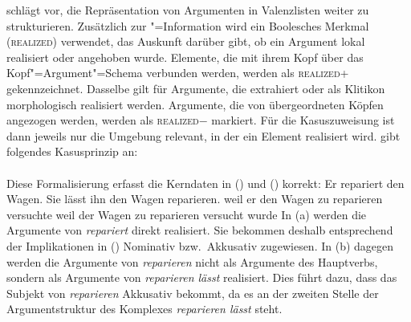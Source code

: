 \prz schlägt vor, die Repräsentation von Argumenten in Valenzlisten
weiter zu strukturieren. Zusätzlich zur "=Information wird
ein Boolesches Merkmal (\textsc{realized}\label{page-realized}) verwendet,
das Auskunft darüber gibt, ob ein Argument lokal realisiert 
oder angehoben wurde. Elemente, die mit ihrem Kopf über das Kopf"=Argument"=Schema
verbunden werden, werden als \textsc{realized}+ gekennzeichnet. Dasselbe gilt
für Argumente, die extrahiert oder als Klitikon
morphologisch realisiert werden.
Argumente, die von übergeordneten Köpfen angezogen werden, werden als
\textsc{realized}$-$ markiert. Für die Kasuszuweisung ist dann jeweils nur
die Umgebung relevant, in der ein Element realisiert wird.
\citet[]{Prze99} gibt folgendes Kasusprinzip an:
\eal
\label{case-prz}
\ex {} \impl \\
    \mbox{}\hfill{}
\ex {} \impl \\
    \mbox{}\hfill{}
\zl
Diese Formalisierung erfasst die Kerndaten in () und () korrekt:
\eal
\ex Er repariert den Wagen.
\ex Sie lässt ihn den Wagen reparieren.
\zl
\eal
\ex weil er den Wagen zu reparieren versuchte
\ex weil der Wagen zu reparieren versucht wurde
\zl
In (a) werden die Argumente von \emph{repariert} direkt realisiert.
Sie bekommen deshalb entsprechend der Implikationen in () Nominativ
bzw.\ Akkusativ zugewiesen. In (b) dagegen werden die Argumente von
\emph{reparieren} nicht als Argumente des Hauptverbs, sondern als Argumente
von \emph{reparieren lässt} realisiert. Dies führt dazu, dass das Subjekt
von \emph{reparieren} Akkusativ bekommt, da es an der zweiten Stelle
der Argumentstruktur des Komplexes \emph{reparieren lässt} steht.

